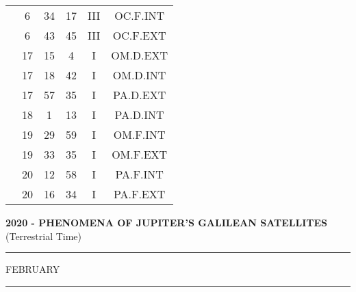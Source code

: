 \documentclass[12pt, a4paper]{article}
\begin{document}
\begin{multicols}{3}
{\begin{tabular}{c c c c c c}
	 	 	 	 & 6 & 34 & 17 & III & OC.F.INT\\%
	 	 	 	 & 6 & 43 & 45 & III & OC.F.EXT\\%
	 	 	 	 & 17 & 15 & 4 & I & OM.D.EXT\\%
	 	 	 	 & 17 & 18 & 42 & I & OM.D.INT\\%
	 	 	 	 & 17 & 57 & 35 & I & PA.D.EXT\\%
	 	 	 	 & 18 & 1 & 13 & I & PA.D.INT\\%
	 	 	 	 & 19 & 29 & 59 & I & OM.F.INT\\%
	 	 	 	 & 19 & 33 & 35 & I & OM.F.EXT\\%
	 	 	 	 & 20 & 12 & 58 & I & PA.F.INT\\%
	 	 	 	 & 20 & 16 & 34 & I & PA.F.EXT\\%
	 	 \end{tabular}
 	}
\end{multicols}
\textbf{2020 - PHENOMENA OF JUPITER'S GALILEAN SATELLITES}\\(Terrestrial Time) 
\vspace{0.1cm} \hrule \vspace{0.1cm}
FEBRUARY\vspace{0.1cm}
\hrule
\vspace{-0.2cm}
\end{document}
